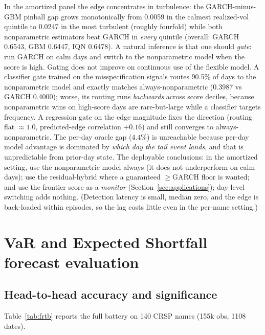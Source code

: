 \documentclass[11pt]{article}
\theoremstyle{remark}
\begin{document}
In the amortized panel the edge concentrates in turbulence: the
GARCH-minus-GBM pinball gap grows monotonically from 0.0059 in the
calmest realized-vol quintile to 0.0247 in the most turbulent (roughly
fourfold) while both nonparametric estimators beat GARCH in
\emph{every} quintile (overall: GARCH 0.6543, GBM 0.6447, IQN 0.6478).
A natural inference is that one should \emph{gate}: run GARCH on calm
days and switch to the nonparametric model when the score is high. Gating
does not improve on continuous use of the flexible model. A classifier
gate trained on the misspecification
signals routes 90.5\% of days to the nonparametric model and exactly
matches always-nonparametric (0.3987 vs GARCH 0.4000); worse, its
routing runs \emph{backwards} across score deciles, because nonparametric
wins on high-score days are rare-but-large while a classifier targets
frequency. A regression gate on the edge magnitude fixes the direction
(routing flat $\approx 1.0$, predicted-edge correlation $+0.16$) and
still converges to always-nonparametric. The per-day oracle gap
($4.4\%$) is unreachable because per-day model advantage is dominated by
\emph{which day the tail event lands}, and that is unpredictable from
prior-day state. The deployable conclusions: in the amortized setting, use the
nonparametric model always (it does not underperform on calm days); use
the residual-hybrid where a guaranteed $\ge$GARCH floor is wanted; and
use the frontier score as a \emph{monitor} (Section~\ref{sec:applications});
day-level switching adds nothing. (Detection latency is small, median zero, and the edge is back-loaded
within episodes, so the lag costs little even in the per-name
setting.)

\section{VaR and Expected Shortfall forecast evaluation}\label{sec:frtb}

\subsection{Head-to-head accuracy and significance}

Table~\ref{tab:frtb} reports the full battery on 140 CRSP names
(155k obs, 1108 dates).
\end{document}
